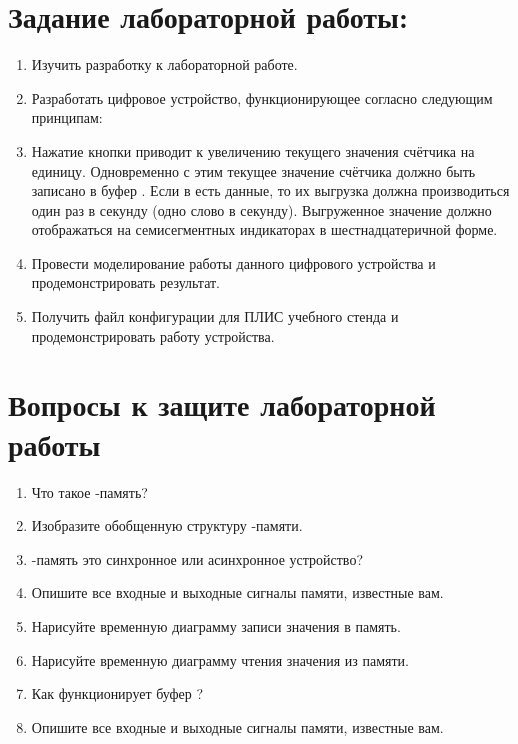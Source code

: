 

\section{Задание лабораторной работы:}

\begin{enumerate}[noitemsep,topsep=0pt, after=\vspace{2pt}]

	\item{Изучить разработку к лабораторной работе.}
	\item{Разработать цифровое устройство, функционирующее согласно следующим принципам:}
	\item{Нажатие кнопки приводит к увеличению текущего значения счётчика на единицу. Одновременно с этим текущее значение счётчика должно быть записано в буфер . Если в  есть данные, то их выгрузка должна производиться один раз в секунду (одно слово в секунду). Выгруженное значение должно отображаться на семисегментных индикаторах в шестнадцатеричной форме.}
	\item{Провести моделирование работы данного цифрового устройства и продемонстрировать результат.}
	\item{Получить файл конфигурации для ПЛИС учебного стенда и продемонстрировать работу устройства.}

\end{enumerate}


\section{Вопросы к защите лабораторной работы}


\begin{enumerate}[noitemsep,topsep=0pt, after=\vspace{2pt}]

	\item{Что такое -память?}
	\item{Изобразите обобщенную структуру -памяти.}
	\item{-память это синхронное или асинхронное устройство?}
	\item{Опишите все входные и выходные сигналы  памяти, известные вам.}
	\item{Нарисуйте временную диаграмму записи значения в  память.}
	\item{Нарисуйте временную диаграмму чтения значения из  памяти.}
	\item{Как функционирует буфер ?}
	\item{Опишите все входные и выходные сигналы  памяти, известные вам.}

\end{enumerate}
